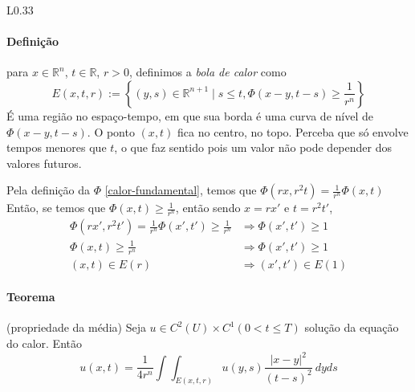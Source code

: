 \documentclass[11pt]{article}
\newcommand{\R}{\mathbb{R}}
\newcommand{\Rn}{{\mathbb{R}^n}}
\begin{document}
\begin{wrapfigure}{L}{0.33\textwidth}
\end{wrapfigure}

\paragraph{Definição} para \(x \in \Rn\), \(t\in\R\), \(r>0\), definimos a \textit{bola de calor} como \[E(x,t,r) := \left\{ (y,s) \in \R^{n+1} \mid s\leq t, \Phi(x-y, t-s) \geq \frac{1}{r^n}  \right\}\] É uma região no espaço-tempo, em que sua borda é uma curva de nível de \(\Phi(x-y, t-s)\). O ponto \((x,t)\) fica no centro, no topo. Perceba que só envolve tempos menores que \(t\), o que faz sentido pois um valor não pode depender dos valores futuros. 

Pela definição da \(\Phi\) \eqref{calor-fundamental}, temos que \(\Phi(rx, r^2t) = \frac{1}{r^n}\Phi(x,t)\)
Então, se temos que \(\Phi(x,t)\geq \frac{1}{r^n}\), então sendo \(x=rx'\) e \(t=r^2t'\), \begin{align*}
	\Phi(rx',r^2 t') = \frac{1}{r^n}\Phi(x',t') \geq \frac{1}{r^n} &\Rightarrow \Phi(x', t')\geq 1\\
	\Phi(x,t)\geq\frac{1}{r^n} &\Rightarrow \Phi(x', t') \geq 1\\
	(x,t) \in E(r) &\Rightarrow (x',t')\in E(1)
\end{align*}
\paragraph{Teorema} (propriedade da média) Seja \(u \in C^2(U)\times C^1(0< t\leq T)\) solução da equação do calor. Então \begin{equation}\label{calor-propmedia}
	u(x,t) = \frac{1}{4r^n} \int \int_{E(x,t,r)} u(y,s) \frac{|x-y|^2}{(t-s)^2}\ dyds
\end{equation}
\end{document}
